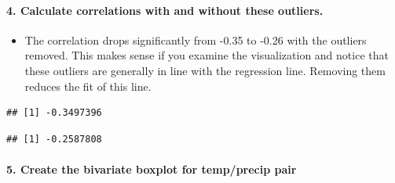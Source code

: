 \documentclass[
]{article}
\newenvironment{Shaded}{\begin{snugshade}}{\end{snugshade}}
\newcommand{\KeywordTok}[1]{\textcolor[rgb]{0.13,0.29,0.53}{\textbf{#1}}}
\newcommand{\NormalTok}[1]{#1}
\newcommand{\OperatorTok}[1]{\textcolor[rgb]{0.81,0.36,0.00}{\textbf{#1}}}
\providecommand{\tightlist}{%
  \setlength{\itemsep}{0pt}\setlength{\parskip}{0pt}}
\begin{document}
\hypertarget{calculate-correlations-with-and-without-these-outliers.}{%
\paragraph{\texorpdfstring{\textbf{4. Calculate correlations with and
without these
outliers.}}{4. Calculate correlations with and without these outliers.}}\label{calculate-correlations-with-and-without-these-outliers.}}

\begin{itemize}
\tightlist
\item
  The correlation drops significantly from -0.35 to -0.26 with the
  outliers removed. This makes sense if you examine the visualization
  and notice that these outliers are generally in line with the
  regression line. Removing them reduces the fit of this line.
\end{itemize}

\begin{Shaded}
\end{Shaded}

\begin{verbatim}
## [1] -0.3497396
\end{verbatim}

\begin{Shaded}
\end{Shaded}

\begin{verbatim}
## [1] -0.2587808
\end{verbatim}

\hypertarget{create-the-bivariate-boxplot-for-tempprecip-pair}{%
\paragraph{\texorpdfstring{\textbf{5. Create the bivariate boxplot for
temp/precip
pair}}{5. Create the bivariate boxplot for temp/precip pair}}\label{create-the-bivariate-boxplot-for-tempprecip-pair}}
\end{document}
